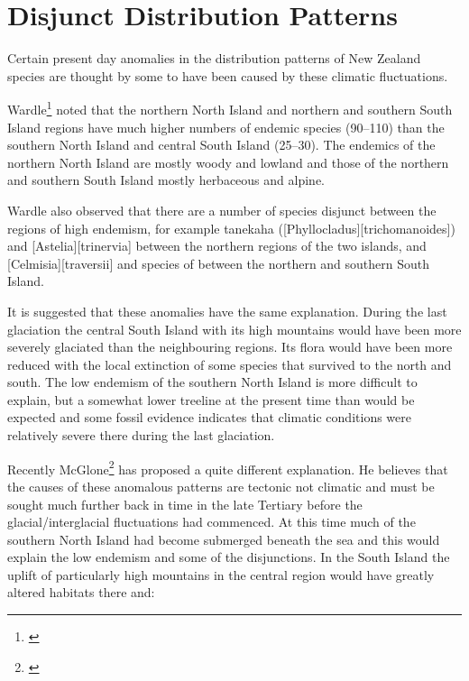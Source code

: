 \section{Disjunct Distribution Patterns}

Certain present day anomalies in the distribution patterns of New Zealand species are thought by some to have been caused by these climatic fluctuations.

Wardle\footnote{\cite{wardle1963evolution}} noted that the northern North Island and northern and southern South Island regions have much higher numbers of endemic species (90--110) than the southern North Island and central South Island (25--30).
The endemics of the northern North Island are mostly woody and lowland and those of the northern and southern South Island mostly herbaceous and alpine.

Wardle also observed that there are a number of species disjunct between the regions of high endemism, for example tanekaha ([Phyllocladus][trichomanoides]) and [Astelia][trinervia] between the northern regions of the two islands, and [Celmisia][traversii] and species of  between the northern and southern South Island.

It is suggested that these anomalies have the same explanation.
During the last glaciation the central South Island with its high mountains would have been more severely glaciated than the neighbouring regions.
Its flora would have been more reduced with the local extinction of some species that survived to the north and south.
The low endemism of the southern North Island is more difficult to explain, but a somewhat lower treeline at the present time than would be expected and some fossil evidence indicates that climatic conditions were relatively severe there during the last glaciation.

Recently McGlone\footnote{\cite{mcglone1985plant}} has proposed a quite different explanation.
He believes that the causes of these anomalous patterns are tectonic not climatic and must be sought much further back in time in the late Tertiary before the glacial/interglacial fluctuations had commenced.
At this time much of the southern North Island had become submerged beneath the sea and this would explain the low endemism and some of the disjunctions.
In the South Island the uplift of particularly high mountains in the central region would have greatly altered habitats there and:

